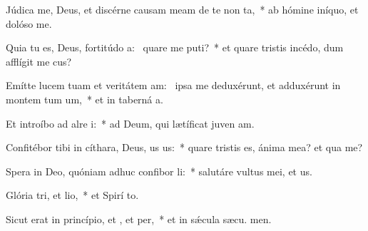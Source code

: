 \item Júdica me, Deus, et discérne causam meam de te non ta,~* ab hómine iníquo, et dolóso  me.
\item Quia tu es, Deus, fortitúdo a:~\pscross{} quare me puti?~* et quare tristis incédo, dum afflígit me cus?
\item Emítte lucem tuam et veritátem am:~\pscross{} ipsa me deduxérunt, et adduxérunt in montem tum um,~* et in taberná a.
\item Et introíbo ad alre i:~* ad Deum, qui lætíficat juven am.
\item Confitébor tibi in cíthara, Deus, us us:~* quare tristis es, ánima mea? et qua  me?
\item Spera in Deo, quóniam adhuc confibor li:~* salutáre vultus mei, et  us.
\item Glória tri, et lio,~* et Spirí to.
\item Sicut erat in princípio, et , et per,~* et in sǽcula sæcu. men.
